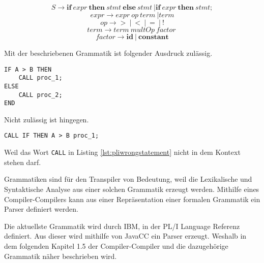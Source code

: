 \begin{center}
\begin{equation}\label{eqn:start}
S \to \mathbf{if}\: expr\: \mathbf{then}\: stmt\: \mathbf{else}\: stmt\: | \mathbf{if}\: expr\: \mathbf{then}\: stmt;
\end{equation}
\begin{equation}
expr \to expr\: op\: term\: | term
\end{equation}
\begin{equation}
op \to \mathbf{>}\: |\: \mathbf{<}\: |\: \mathbf{=}\: |\: \mathbf{!}
\end{equation}
\begin{equation}
term \to term\: multOp\: factor\:
\end{equation}
\begin{equation}
factor \to \mathbf{id}\: |\: \mathbf{constant} 
\end{equation}
\end{center}
 
Mit der beschriebenen Grammatik ist folgender Ausdruck zulässig.

\begin{lstlisting}[language=PL/I, caption=If Statement PL/I, label={lst:pliifstatement}]
IF A > B THEN 
	CALL proc_1;
ELSE 
	CALL proc_2;
END
\end{lstlisting}

Nicht zulässig ist hingegen.

\begin{lstlisting}[language=PL/I, caption=Wrong Statement PL/I, label={lst:pliwrongstatement}]
CALL IF THEN A > B proc_1;
\end{lstlisting}

Weil das Wort \verb+CALL+ in Listing \ref{lst:pliwrongstatement} nicht in dem Kontext stehen darf.

	
Grammatiken sind für den Transpiler von Bedeutung, weil die Lexikalische und Syntaktische Analyse aus einer solchen Grammatik erzeugt werden. Mithilfe eines Compiler-Compilers kann aus einer Repräsentation einer formalen Grammatik ein Parser definiert werden.
 
Die aktuellste Grammatik wird durch IBM, in der PL/I Language Referenz definiert. Aus dieser wird mithilfe von JavaCC ein Parser erzeugt. Weshalb in dem folgenden Kapitel 1.5 der Compiler-Compiler und die dazugehörige Grammatik näher beschrieben wird.

